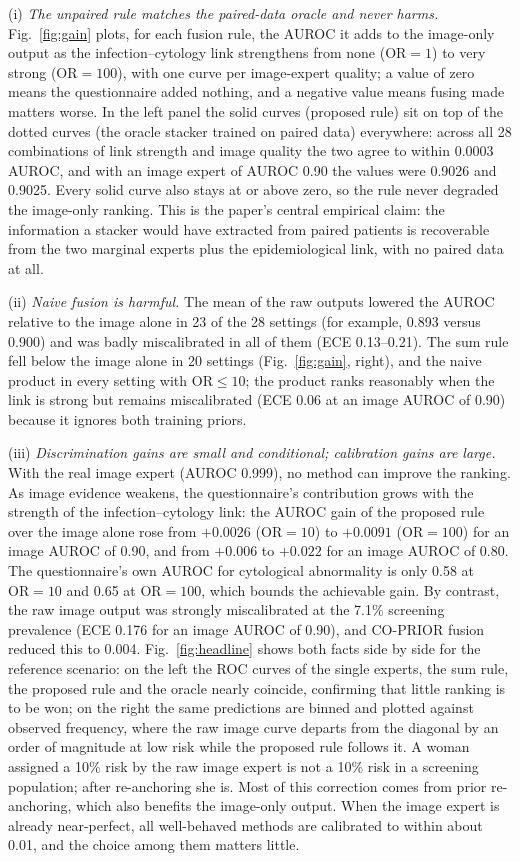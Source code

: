 \documentclass[lettersize,journal]{IEEEtran}
\begin{document}
(i) \emph{The unpaired rule matches the paired-data oracle and never harms.} Fig.~\ref{fig:gain} plots, for each fusion rule, the AUROC it adds to the image-only output as the infection--cytology link strengthens from none ($\mathrm{OR}=1$) to very strong ($\mathrm{OR}=100$), with one curve per image-expert quality; a value of zero means the questionnaire added nothing, and a negative value means fusing made matters worse. In the left panel the solid curves (proposed rule) sit on top of the dotted curves (the oracle stacker trained on paired data) everywhere: across all 28 combinations of link strength and image quality the two agree to within 0.0003 AUROC, and with an image expert of AUROC 0.90 the values were 0.9026 and 0.9025. Every solid curve also stays at or above zero, so the rule never degraded the image-only ranking. This is the paper's central empirical claim: the information a stacker would have extracted from paired patients is recoverable from the two marginal experts plus the epidemiological link, with no paired data at all.

(ii) \emph{Naive fusion is harmful.} The mean of the raw outputs lowered the AUROC relative to the image alone in 23 of the 28 settings (for example, 0.893 versus 0.900) and was badly miscalibrated in all of them (ECE 0.13--0.21). The sum rule fell below the image alone in 20 settings (Fig.~\ref{fig:gain}, right), and the naive product in every setting with $\mathrm{OR}\le10$; the product ranks reasonably when the link is strong but remains miscalibrated (ECE 0.06 at an image AUROC of 0.90) because it ignores both training priors.

(iii) \emph{Discrimination gains are small and conditional; calibration gains are large.} With the real image expert (AUROC 0.999), no method can improve the ranking. As image evidence weakens, the questionnaire's contribution grows with the strength of the infection--cytology link: the AUROC gain of the proposed rule over the image alone rose from $+0.0026$ ($\mathrm{OR}=10$) to $+0.0091$ ($\mathrm{OR}=100$) for an image AUROC of 0.90, and from $+0.006$ to $+0.022$ for an image AUROC of 0.80. The questionnaire's own AUROC for cytological abnormality is only 0.58 at $\mathrm{OR}=10$ and 0.65 at $\mathrm{OR}=100$, which bounds the achievable gain. By contrast, the raw image output was strongly miscalibrated at the 7.1\% screening prevalence (ECE 0.176 for an image AUROC of 0.90), and CO-PRIOR fusion reduced this to 0.004. Fig.~\ref{fig:headline} shows both facts side by side for the reference scenario: on the left the ROC curves of the single experts, the sum rule, the proposed rule and the oracle nearly coincide, confirming that little ranking is to be won; on the right the same predictions are binned and plotted against observed frequency, where the raw image curve departs from the diagonal by an order of magnitude at low risk while the proposed rule follows it. A woman assigned a 10\% risk by the raw image expert is not a 10\% risk in a screening population; after re-anchoring she is. Most of this correction comes from prior re-anchoring, which also benefits the image-only output. When the image expert is already near-perfect, all well-behaved methods are calibrated to within about 0.01, and the choice among them matters little.
\end{document}
